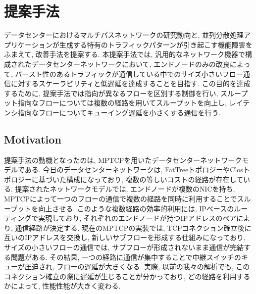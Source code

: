 \chapter{提案手法}
\label{chapter:proposal}
データセンターにおけるマルチパスネットワークの研究動向と, 並列分散処理アプリケーションが生成する特有のトラフィックパターンが引き起こす機能障害をふまえて,
改善手法を提案する.
本提案手法では, 
汎用的なネットワーク機器で構成されたデータセンターネットワークにおいて, エンドノードのみの改良によって, 
バースト性のあるトラフィックが通信している中でのサイズ小さいフロー通信に対するスケーラビリティと低遅延を達成することを目指す.
この目的を達成するために, 提案手法では指向が異なるフローを区別する制御を行い,
スループット指向なフローについては複数の経路を用いてスループットを向上し, レイテンシ指向なフローについてキューイング遅延を小さくする通信を行う.

\section{Motivation}
提案手法の動機となったのは, MPTCPを用いたデータセンターネットワークモデルである\cite{improving}.
今日のデータセンターネットワークは, FatTreeトポロジーやClosトポロジーに基づいた構成になっており\cite{dctcp, vl2},
複数の等しいコストの経路が存在している. 
提案されたネットワークモデルでは, エンドノードが複数のNICを持ち,
MPTCPによって一つのフローの通信で複数の経路を同時に利用することでスループットを向上させる.
このような複数経路の効率的利用には, IPベースのルーティングで実現しており, それぞれのエンドノードが持つIPアドレスのペアにより, 通信経路が決定する.
現在のMPTCPの実装では, TCPコネクション確立後に互いのIPアドレスを交換し,
新しいサブフローを形成する仕組みになっており, サイズの小さいフローの通信では, サブフローが形成されないまま通信が完結する問題がある. 
その結果, 一つの経路に通信が集中することで中継スイッチのキューが圧迫され, フローの遅延が大きくなる. 
実際, 以前の我々の解析でも, このコネクション確立の際に遅延が生じることが分かっており\cite{mptcp_ana}, どの経路を利用するかによって,
性能性能が大きく変わる.

